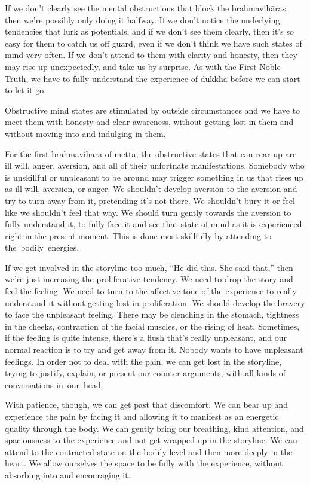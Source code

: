 If we don't clearly see the mental obstructions that block the brahmavihāras, then we're possibly only doing it halfway. If we don't notice the underlying tendencies that lurk as potentials, and if we don't see them clearly, then it's so easy for them to catch us off guard, even if we don't think we have such states of mind very often. If we don't attend to them with clarity and honesty, then they may rise up unexpectedly, and take us by surprise. As with the First Noble Truth, we have to fully understand the experience of dukkha before we can start to let it go.

Obstructive mind states are stimulated by outside circumstances and we have to meet them with honesty and clear awareness, without getting lost in them and without moving into and indulging in them.

\enlargethispage{1\baselineskip}
For the first brahmavihāra of mettā, the obstructive states that can rear up are ill will, anger, aversion, and all of their unfortnate manifestations. Somebody who is unskillful or unpleasant to be around may trigger something in us that rises up as ill will, aversion, or anger. We shouldn't develop aversion to the aversion and try to turn away from it, pretending it's not there. We shouldn't bury it or feel like we shouldn't feel that way. We should turn gently towards the aversion to fully understand it, to fully face it and see that state of mind as it is experienced right in the present moment. This is done most skillfully by attending to \mbox{the bodily energies.}

If we get involved in the storyline too much, ``He did this. She said that,'' then we're just increasing the proliferative \mbox{tendency}. We need to drop the story and feel the feeling. We need to turn to the affective tone of the experience to really understand it without getting lost in proliferation. We should develop the bravery to face the unpleasant feeling. There may be clenching in the stomach, tightness in the cheeks, contraction of the facial muscles, or the rising of heat. Sometimes, if the feeling is quite intense, there's a flush that's really unpleasant, and our normal reaction is to try and get away from it. Nobody wants to have unpleasant feelings. In order not to deal with the pain, we can get lost in the storyline, trying to justify, explain, or present our counter-arguments, with all kinds of conversations \mbox{in our head.}

With patience, though, we can get past that discomfort. We can bear up and experience the pain by facing it and allowing it to manifest as an energetic quality through the body. We can gently bring our breathing, kind attention, and spaciousness to the experience and not get wrapped up in the storyline. We can attend to the contracted state on the bodily level and then more deeply in the heart. We allow ourselves the space to be fully with the experience, without absorbing into and encouraging it.


